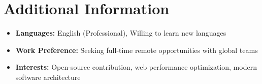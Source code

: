 \documentclass[11pt]{article}
\begin{document}
\section{Additional Information}
\begin{itemize}
\item \textbf{Languages:} English (Professional), Willing to learn new languages
\item \textbf{Work Preference:} Seeking full-time remote opportunities with global teams
\item \textbf{Interests:} Open-source contribution, web performance optimization, modern software architecture
\end{itemize}
\end{document}
